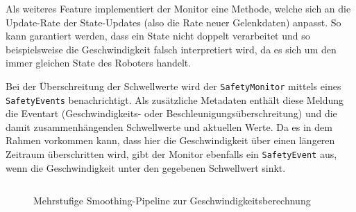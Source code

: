 Als weiteres Feature implementiert der Monitor eine Methode, welche sich an die
Update-Rate der State-Updates (also die Rate neuer Gelenkdaten) anpasst. So kann
garantiert werden, dass ein State nicht doppelt verarbeitet und so
beispielsweise die Geschwindigkeit falsch interpretiert wird, da es sich um den
immer gleichen State des Roboters handelt.

Bei der Überschreitung der Schwellwerte wird der \texttt{SafetyMonitor}
mittels eines \texttt{SafetyEvents} benachrichtigt. Als zusätzliche
Metadaten enthält
diese Meldung die Eventart (Geschwindigkeits- oder
Beschleunigungsüberschreitung) und die damit zusammenhängenden Schwellwerte und
aktuellen Werte. Da es in dem Rahmen vorkommen kann, dass hier die
Geschwindigkeit über einen längeren Zeitraum überschritten wird, gibt der
Monitor ebenfalls ein \texttt{SafetyEvent} aus, wenn die
Geschwindigkeit unter den
gegebenen Schwellwert sinkt.

\begin{figure}[H]
  \inputminted[fontsize=\footnotesize]{csharp}{code-snippets/SmoothVelocities.cs}
  \caption{Mehrstufige Smoothing-Pipeline zur Geschwindigkeitsberechnung}
  \label{listing:smoothing_pipeline}
\end{figure}
